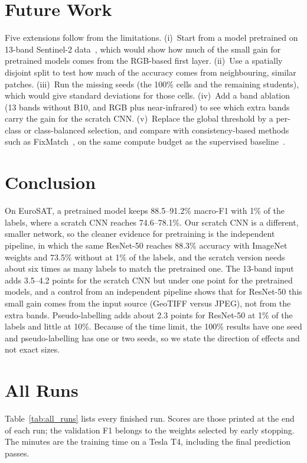 \documentclass[conference]{IEEEtran}
\begin{document}
\section{Future Work}\label{sec:future}
Five extensions follow from the limitations. (i)~Start from a model pretrained on 13-band Sentinel-2 data~\cite{wang2023ssl4eo,cong2022satmae}, which would show how much of the small gain for pretrained models comes from the RGB-based first layer. (ii)~Use a spatially disjoint split to test how much of the accuracy comes from neighbouring, similar patches. (iii)~Run the missing seeds (the 100\% cells and the remaining students), which would give standard deviations for those cells. (iv)~Add a band ablation (13 bands without B10, and RGB plus near-infrared) to see which extra bands carry the gain for the scratch CNN. (v)~Replace the global threshold by a per-class or class-balanced selection, and compare with consistency-based methods such as FixMatch~\cite{sohn2020fixmatch}, on the same compute budget as the supervised baseline~\cite{oliver2018realistic}.

\section{Conclusion}
On EuroSAT, a pretrained model keeps 88.5--91.2\% macro-F1 with 1\% of the labels, where a scratch CNN reaches 74.6--78.1\%. Our scratch CNN is a different, smaller network, so the cleaner evidence for pretraining is the independent pipeline, in which the same ResNet-50 reaches 88.3\% accuracy with ImageNet weights and 73.5\% without at 1\% of the labels, and the scratch version needs about six times as many labels to match the pretrained one. The 13-band input adds 3.5--4.2 points for the scratch CNN but under one point for the pretrained models, and a control from an independent pipeline shows that for ResNet-50 this small gain comes from the input source (GeoTIFF versus JPEG), not from the extra bands. Pseudo-labelling adds about 2.3 points for ResNet-50 at 1\% of the labels and little at 10\%. Because of the time limit, the 100\% results have one seed and pseudo-labelling has one or two seeds, so we state the direction of effects and not exact sizes.




\appendices
\section{All Runs}\label{app:runs}
Table~\ref{tab:all_runs} lists every finished run. Scores are those printed at the end of each run; the validation F1 belongs to the weights selected by early stopping. The minutes are the training time on a Tesla T4, including the final prediction passes.
\end{document}
